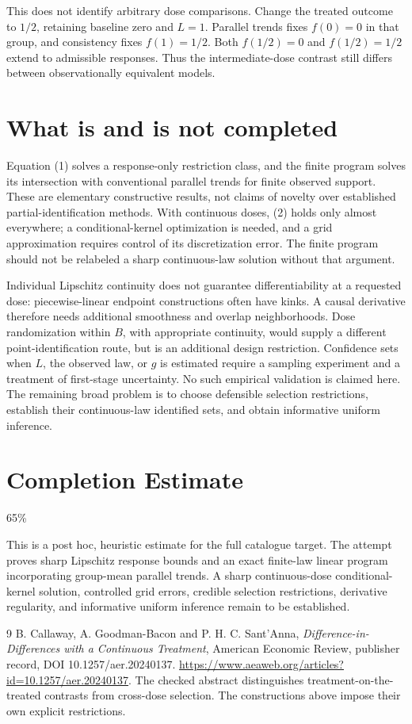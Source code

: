\documentclass[11pt,a4paper]{article}
\begin{document}
This does not identify arbitrary dose comparisons. Change the treated outcome to $1/2$, retaining baseline zero and $L=1$. Parallel trends fixes $f(0)=0$ in that group, and consistency fixes $f(1)=1/2$. Both $f(1/2)=0$ and $f(1/2)=1/2$ extend to admissible responses. Thus the intermediate-dose contrast still differs between observationally equivalent models.

\section{What is and is not completed}
Equation (1) solves a response-only restriction class, and the finite program solves its intersection with conventional parallel trends for finite observed support. These are elementary constructive results, not claims of novelty over established partial-identification methods. With continuous doses, (2) holds only almost everywhere; a conditional-kernel optimization is needed, and a grid approximation requires control of its discretization error. The finite program should not be relabeled a sharp continuous-law solution without that argument.

Individual Lipschitz continuity does not guarantee differentiability at a requested dose: piecewise-linear endpoint constructions often have kinks. A causal derivative therefore needs additional smoothness and overlap neighborhoods. Dose randomization within $B$, with appropriate continuity, would supply a different point-identification route, but is an additional design restriction. Confidence sets when $L$, the observed law, or $g$ is estimated require a sampling experiment and a treatment of first-stage uncertainty. No such empirical validation is claimed here. The remaining broad problem is to choose defensible selection restrictions, establish their continuous-law identified sets, and obtain informative uniform inference.

\section{Completion Estimate}
65\%

This is a post hoc, heuristic estimate for the full catalogue target.
The attempt proves sharp Lipschitz response bounds and an exact finite-law linear program incorporating group-mean parallel trends. A sharp continuous-dose conditional-kernel solution, controlled grid errors, credible selection restrictions, derivative regularity, and informative uniform inference remain to be established.

\begin{thebibliography}{9}
 B. Callaway, A. Goodman-Bacon and P. H. C. Sant'Anna, \emph{Difference-in-Differences with a Continuous Treatment}, American Economic Review, publisher record, DOI 10.1257/aer.20240137. \url{https://www.aeaweb.org/articles?id=10.1257/aer.20240137}. The checked abstract distinguishes treatment-on-the-treated contrasts from cross-dose selection. The constructions above impose their own explicit restrictions.
\end{thebibliography}
\end{document}
